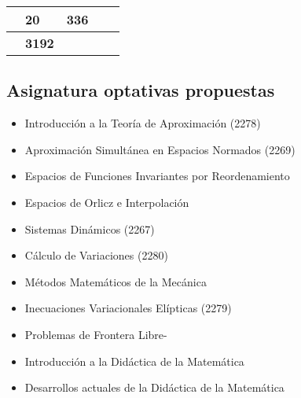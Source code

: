 \documentclass[a4paper, 12pt]{article}
\begin{document}
\begin{center}
\begin{xltabular}{1\textwidth}{|>{\raggedleft\arraybackslash}X |
>{\raggedleft\arraybackslash}X |
>{\raggedright\arraybackslash} p{5cm}|
>{\raggedleft\arraybackslash}X |
>{\raggedleft\arraybackslash}X |}
             & \textbf{20}          &\textbf{336}         \\ \hline
{}                               &\textbf{3192}         \\ \hline
\end{xltabular}
\end{center}
\normalsize

 
 
 
\subsection{Asignatura  optativas propuestas} 

\begin{itemize}


\item {Introducción a la Teoría de Aproximación (2278)}
 



\item { Aproximación Simultánea en Espacios Normados (2269)}
 
 
\item {Espacios de Funciones Invariantes por Reordenamiento}
 


\item {Espacios de Orlicz e Interpolación} 
\ 

 
\item  {Sistemas Dinámicos (2267)}  

\item { Cálculo de Variaciones (2280)} 


\item { Métodos Matemáticos de la Mecánica} 


\item {Inecuaciones Variacionales Elípticas (2279)} 


 


\item {Problemas de Frontera Libre-}  



\item {Introducción a la Didáctica de la Matemática} 




\item {Desarrollos actuales de la Didáctica de la Matemática}  



\end{itemize}
\end{document}
